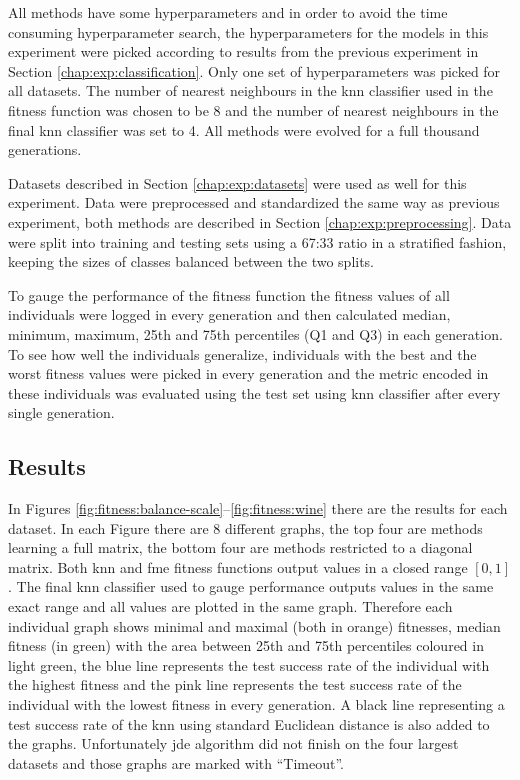 \documentclass[12pt,a4paper]{report}
\begin{document}
All methods have some hyperparameters and in order to avoid the time consuming hyperparameter search, the hyperparameters for the models in this experiment were picked according to results from the previous experiment in Section \ref{chap:exp:classification}. Only one set of hyperparameters was picked for all datasets. The number of nearest neighbours in the \ac{knn} classifier used in the fitness function was chosen to be 8 and the number of nearest neighbours in the final \ac{knn} classifier was set to 4. All methods were evolved for a full thousand generations.

Datasets described in Section \ref{chap:exp:datasets} were used as well for this experiment. Data were preprocessed and standardized the same way as previous experiment, both methods are described in Section \ref{chap:exp:preprocessing}. Data were split into training and testing sets using a 67:33 ratio in a stratified fashion, keeping the sizes of classes balanced between the two splits.

To gauge the performance of the fitness function the fitness values of all individuals were logged in every generation and then calculated median, minimum, maximum, 25th and 75th percentiles (Q1 and Q3) in each generation. To see how well the individuals generalize, individuals with the best and the worst fitness values were picked in every generation and the metric encoded in these individuals was evaluated using the test set using \ac{knn} classifier after every single generation.

\subsection{Results}

In Figures \ref{fig:fitness:balance-scale}--\ref{fig:fitness:wine} there are the results for each dataset. In each Figure there are 8 different graphs, the top four are methods learning a full matrix, the bottom four are methods restricted to a diagonal matrix. Both \ac{knn} and \ac{fme} fitness functions output values in a closed range $[0,1]$. The final \ac{knn} classifier used to gauge performance outputs values in the same exact range and all values are plotted in the same graph. Therefore each individual graph shows minimal and maximal (both in orange) fitnesses, median fitness (in green) with the area between 25th and 75th percentiles coloured in light green, the blue line represents the test success rate of the individual with the highest fitness and the pink line represents the test success rate of the individual with the lowest fitness in every generation. A black line representing a test success rate of the \ac{knn} using standard Euclidean distance is also added to the graphs. Unfortunately \ac{jde} algorithm did not finish on the four largest datasets and those graphs are marked with ``Timeout''.
\end{document}

